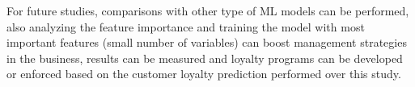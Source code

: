 \documentclass[letterpaper, 10 pt, conference]{ieeeconf}  %
\begin{document}
For future studies, comparisons with other type of ML models can be performed, also analyzing the feature importance and training the model with most important features (small number of variables) can boost management strategies in the business, results can be measured and loyalty programs can be developed or enforced based on the customer loyalty prediction performed over this study.


\addtolength{\textheight}{-12cm}   %





\end{document}
